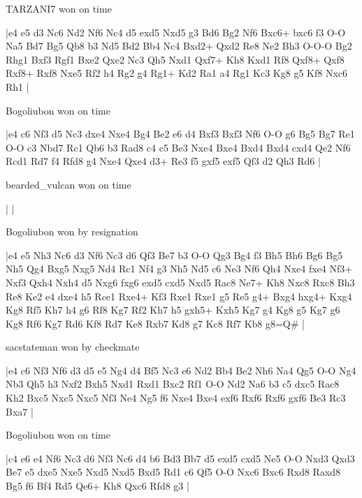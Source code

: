 \showboard

TARZANI7 won on time

\makegametitle
|e4 e5 d3 Nc6 Nd2 Nf6 Nc4 d5 exd5 Nxd5 g3 Bd6 Bg2 Nf6 Bxc6+ bxc6 f3 O-O Na5 Bd7 Bg5 Qb8 b3 Nd5 Bd2 Bb4 Nc4 Bxd2+ Qxd2 Re8 Ne2 Bh3 O-O-O Bg2 Rhg1 Bxf3 Rgf1 Bxe2 Qxe2 Nc3 Qh5 Nxd1 Qxf7+ Kh8 Kxd1 Rf8 Qxf8+ Qxf8 Rxf8+ Rxf8 Nxe5 Rf2 h4 Rg2 g4 Rg1+ Kd2 Ra1 a4 Rg1 Kc3 Kg8 g5 Kf8 Nxc6 Rh1  |

\showboard

Bogoliubon won on time

\makegametitle
|e4 c6 Nf3 d5 Nc3 dxe4 Nxe4 Bg4 Be2 e6 d4 Bxf3 Bxf3 Nf6 O-O g6 Bg5 Bg7 Re1 O-O c3 Nbd7 Rc1 Qb6 b3 Rad8 c4 c5 Be3 Nxe4 Bxe4 Bxd4 Bxd4 cxd4 Qe2 Nf6 Rcd1 Rd7 f4 Rfd8 g4 Nxe4 Qxe4 d3+ Re3 f5 gxf5 exf5 Qf3 d2 Qh3 Rd6  |

\showboard

bearded\_vulcan won on time

\makegametitle
| |

\showboard

Bogoliubon won by resignation

\makegametitle
|e4 e5 Nh3 Nc6 d3 Nf6 Nc3 d6 Qf3 Be7 b3 O-O Qg3 Bg4 f3 Bh5 Bh6 Bg6 Bg5 Nh5 Qg4 Bxg5 Nxg5 Nd4 Rc1 Nf4 g3 Nh5 Nd5 c6 Ne3 Nf6 Qh4 Nxe4 fxe4 Nf3+ Nxf3 Qxh4 Nxh4 d5 Nxg6 fxg6 exd5 cxd5 Nxd5 Rac8 Ne7+ Kh8 Nxc8 Rxc8 Bh3 Re8 Ke2 e4 dxe4 h5 Rce1 Rxe4+ Kf3 Rxe1 Rxe1 g5 Re5 g4+ Bxg4 hxg4+ Kxg4 Kg8 Rf5 Kh7 h4 g6 Rf8 Kg7 Rf2 Kh7 h5 gxh5+ Kxh5 Kg7 g4 Kg8 g5 Kg7 g6 Kg8 Rf6 Kg7 Rd6 Kf8 Rd7 Ke8 Rxb7 Kd8 g7 Kc8 Rf7 Kb8 g8=Q\#  |

\showboard

sacstateman won by checkmate

\makegametitle
|e4 c6 Nf3 Nf6 d3 d5 e5 Ng4 d4 Bf5 Nc3 e6 Nd2 Bb4 Be2 Nh6 Na4 Qg5 O-O Ng4 Nb3 Qh5 h3 Nxf2 Bxh5 Nxd1 Rxd1 Bxc2 Rf1 O-O Nd2 Na6 b3 c5 dxc5 Rac8 Kh2 Bxc5 Nxc5 Nxc5 Nf3 Ne4 Ng5 f6 Nxe4 Bxe4 exf6 Rxf6 Rxf6 gxf6 Be3 Rc3 Bxa7  |

\showboard

Bogoliubon won on time

\makegametitle
|c4 e6 e4 Nf6 Nc3 d6 Nf3 Nc6 d4 b6 Bd3 Bb7 d5 exd5 cxd5 Ne5 O-O Nxd3 Qxd3 Be7 e5 dxe5 Nxe5 Nxd5 Nxd5 Bxd5 Rd1 c6 Qf5 O-O Nxc6 Bxc6 Rxd8 Raxd8 Bg5 f6 Bf4 Rd5 Qe6+ Kh8 Qxc6 Rfd8 g3  |

